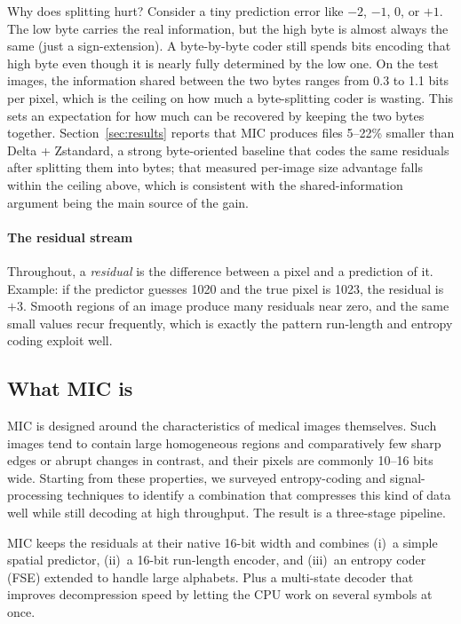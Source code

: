 \documentclass[journal]{IEEEtran}
\begin{document}
Why does splitting hurt? Consider a tiny prediction error like $-2$, $-1$, 0,
or $+1$. The low byte carries the real information, but the high byte is
almost always the same (just a sign-extension). A byte-by-byte coder still
spends bits encoding that high byte even though it is nearly fully
determined by the low one. On the test images, the information shared
between the two bytes ranges from 0.3 to 1.1 bits per pixel, which is the
ceiling on how much a byte-splitting coder is wasting. This sets an
expectation for how much can be recovered by keeping the two bytes together.
Section~\ref{sec:results} reports that MIC produces files 5--22\% smaller than
Delta + Zstandard, a strong byte-oriented baseline that codes the same residuals
after splitting them into bytes; that measured per-image size advantage falls
within the ceiling above, which is consistent with the shared-information
argument being the main source of the gain.

\paragraph{The residual stream} Throughout, a \emph{residual} is the
difference between a pixel and a prediction of it. Example: if the predictor
guesses 1020 and the true pixel is 1023, the residual is $+3$. Smooth regions
of an image produce many residuals near zero, and the same small values recur
frequently, which is exactly the pattern run-length and entropy coding exploit
well.

\subsection{What MIC is}

MIC is designed around the characteristics of medical images themselves. Such
images tend to contain large homogeneous regions and comparatively few sharp
edges or abrupt changes in contrast, and their pixels are commonly 10--16 bits
wide. Starting from these properties, we surveyed entropy-coding and
signal-processing techniques to identify a combination that compresses this kind
of data well while still decoding at high throughput. The result is a
three-stage pipeline.

MIC keeps the residuals at their native 16-bit width and combines (i)~a simple
spatial predictor, (ii)~a 16-bit run-length encoder, and (iii)~an entropy coder
(FSE) extended to handle large alphabets. Plus a multi-state decoder that
improves decompression speed by letting the CPU work on several symbols at
once.
\end{document}
